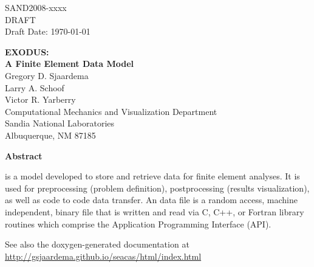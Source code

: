 \begin{titlepage}
\begin{center}
SAND2008-xxxx\\
DRAFT\\
Draft Date: \today\\
\end{center}

\vspace{1.0in}

\begin{center}
{\Huge\bf EXODUS:\\ A Finite Element Data Model\\}
\vspace{1.0in}
{\large Gregory D. Sjaardema\\
	Larry A. Schoof\\
	Victor R. Yarberry\\
	Computational Mechanics and Visualization Department\\
	Sandia National Laboratories\\
	Albuquerque, NM 87185}
\end{center}
\vspace{1.0in}
\begin{center}
\large\bf Abstract	
\end{center}

\exo{} is a model developed to store and retrieve data for finite
element analyses. It is used for preprocessing (problem definition),
postprocessing (results visualization), as well as code to code data
transfer. An \exo{} data file is a random access, machine independent,
binary file that is written and read via C, C++, or Fortran library
routines which comprise the Application Programming Interface (API).

See also the doxygen-generated documentation at \url{http://gsjaardema.github.io/seacas/html/index.html}

\end{titlepage}
